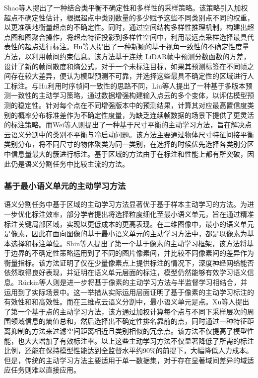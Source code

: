 Shao等人提出了一种结合类平衡不确定性和多样性的采样策略。该策略引入加权超点不确定性估计，根据超点中类别数量的多少赋予这些不同类别点不同的权重，以更准确地衡量超点的不确定性。同时，通过空间结构多样性推理机制，构建出超点图和图聚合操作，将超点特征投影到多样性空间中，利用最远点采样选择最具代表性的超点进行标注。Hu等人提出了一种新颖的基于视角一致性的不确定性度量方法，以利用帧间约束信息。该方法基于连续 LiDAR帧中预测分数函数的方差，设计了新的帧间散度和熵公式，对于一个未标注目标，如果其预测标签在不同帧之间存在较大差异，便认为模型预测不可靠，并选择这些最具不确定性的区域进行人工标注。与Hu利用时序帧间一致性的思路不同，Liu等人提出了一种基于多版本预测一致性的主动学习策略，通过数据增强构建输入点云的多个变体，以评估模型预测的稳定性。针对每个点在不同增强版本中的预测结果，计算其对应最高置信度类别的概率分布标准差作为不确定性度量，为缺乏连续帧数据的场景下提供了更灵活的标注策略。而Wei等人则提出了一种基于尺寸平衡的主动学习方法，旨在解决点云语义分割中的类别不平衡与冷启动问题。该方法主要通过物体尺寸特征间接平衡类别分布，将不同尺寸的物体聚类为同一类别，在选择的时候优先选择各类别分区中信息量最大的簇进行标注。基于区域的方法由于在标注和性能上都有所突破，因此仍是语义分割任务中比较主流的方法。
\subsubsection{基于最小语义单元的主动学习方法}
语义分割任务中基于区域的主动学习方法显著优于基于样本主动学习的方法。为进一步优化标注效率，部分学者提出将选择粒度细化至最小语义单元，旨在通过精准标注关键局部区域，实现以更低成本的更高表现。在二维图像中，最小的语义单元是像素，因此在面向图像的基于最小语义单元的主动学习方法中，都是以像素为基本选择和标注单位。Shin等人提出了第一个基于像素的主动学习框架，该方法将基于边界的不确定性策略运用到了不同的图片像素间，并比较不同像素间的差异作为衡量指标。该方法证明了仅在少量像素点上提供标注的情况下，深度神经网络能否依然取得良好表现，并证明在语义单元层面的标注，模型仍然能够有效学习语义信息。Rückin等人则是进一步将基于像素的主动学习方法与半监督学习相结合，并运用到了实际场景中。这一举措从实际运用层面证明了基于像素的主动学习标注的有效性和和高效性。而在三维点云语义分割中，最小语义单元是点。Xu等人提出了第一个基于点的主动学习方法，该方通过加权计算每个点与不同下采样层次的周围领域信息的熵值总和，然后选择出不确定性排名靠前的点，同时通过一种特征距离抑制的方法来过滤空间距离相近且类别相似的冗余点。该方法不仅提高了模型性能，也大大增加了有效标注率。以上这些主动学习方法不仅显著降低了所需的标注比例，还能在保持模型性能达到全监督水平约90\%的前提下，大幅降低人力成本。但是，传统的主动学习方法主要适用于单一数据集，对于存在显著域间差异的域适应任务则难以直接应用。
